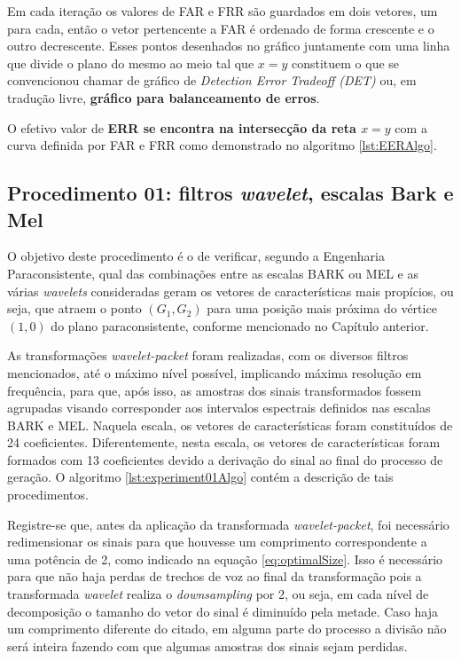 		\par Em cada iteração os valores de FAR e FRR são guardados em dois vetores, um para cada, então o vetor pertencente a FAR é ordenado de forma crescente e o outro decrescente. Esses pontos desenhados no gráfico juntamente com uma linha que divide o plano do mesmo ao meio tal que $x=y$ constituem o que se convencionou chamar de gráfico de \textit{Detection Error Tradeoff (DET)} ou, em tradução livre, \textbf{gráfico para balanceamento de erros}.
		
		\par O efetivo valor de \textbf{ERR se encontra na intersecção da reta $x=y$} com a curva definida por FAR e FRR como demonstrado no algoritmo \ref{lst:EERAlgo}.
	
		
	
		\subsection{Procedimento 01: filtros \textit{wavelet}, escalas Bark e Mel}
		\label{chap:propApproach:sec:Experimento01}
		\par O objetivo deste procedimento é o de verificar, segundo a Engenharia Paraconsistente, qual das combinações entre as escalas BARK ou MEL e as várias \textit{wavelets} consideradas geram os vetores de características mais propícios, ou seja, que atraem o ponto $(G_1,G_2)$ para uma posição mais próxima do vértice $(1,0)$ do plano paraconsistente, conforme mencionado no Capítulo anterior. 
				
		\par As transformações \textit{wavelet-packet} foram realizadas, com os diversos filtros mencionados, até  o máximo nível possível, implicando máxima resolução em frequência, para que, após isso, as amostras dos sinais transformados fossem agrupadas visando corresponder aos intervalos espectrais definidos nas escalas BARK e MEL. Naquela escala, os vetores de características foram constituídos de 24 coeficientes. Diferentemente, nesta escala, os vetores de características foram formados com 13 coeficientes devido a derivação do sinal ao final do processo de geração. O algoritmo \ref{lst:experiment01Algo} contém a descrição de tais procedimentos.
			
		

		\par Registre-se que, antes da aplicação da transformada \textit{wavelet-packet}, foi necessário redimensionar os sinais para que houvesse um comprimento correspondente a uma potência de 2, como indicado na equação \ref{eq:optimalSize}. Isso é necessário para que não haja perdas de trechos de voz ao final da transformação pois a transformada \textit{wavelet} realiza o \textit{downsampling} por 2, ou seja, em cada nível de decomposição o tamanho do vetor do sinal é diminuído pela metade. Caso haja um comprimento diferente do citado, em alguma parte do processo a divisão não será inteira fazendo com que algumas amostras dos sinais sejam perdidas.
				
